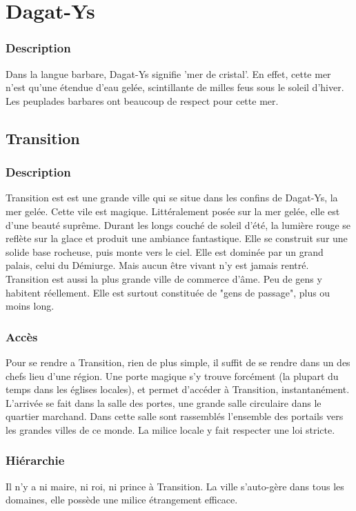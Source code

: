\section{Dagat-Ys}
\subsubsection{Description}
\hypertarget {dagatys}{}Dans la langue barbare, Dagat-Ys signifie 'mer de cristal'.
En effet, cette mer n'est qu'une étendue d'eau gelée, scintillante de milles feus sous le soleil d'hiver.
Les peuplades barbares ont beaucoup de respect pour cette mer.
\subsection{Transition}
\subsubsection{Description}
\hypertarget {transition}{}
Transition est est une grande ville qui se situe dans les confins de Dagat-Ys, la mer gelée. 
Cette vile est magique. Littéralement posée sur la mer gelée, elle est d'une beauté suprême.
Durant les longs couché de soleil d'été, la lumière rouge se reflète sur la glace et produit une ambiance fantastique. Elle se construit sur une solide base rocheuse, puis monte vers le ciel.
Elle est dominée par un grand palais, celui du Démiurge. Mais aucun être vivant n'y est jamais rentré.
Transition est aussi la plus grande ville de commerce d'âme. Peu de gens y habitent réellement.
Elle est surtout constituée de "gens de passage", plus ou moins long.
\subsubsection{Accès}
Pour se rendre a Transition, rien de plus simple, il suffit de se rendre dans un des chefs lieu d'une région. Une porte magique s'y trouve forcément (la plupart du temps dans les églises locales), et permet d'accéder à Transition, instantanément.
L'arrivée se fait dans la salle des portes, une grande salle circulaire dans le quartier marchand. Dans cette salle sont rassemblés l'ensemble des portails vers les grandes villes de ce monde. La milice locale y fait respecter une loi stricte.
\subsubsection{Hiérarchie}
Il n'y a ni maire, ni roi, ni prince à Transition. La ville s'auto-gère dans tous les domaines, elle possède une milice étrangement efficace.

